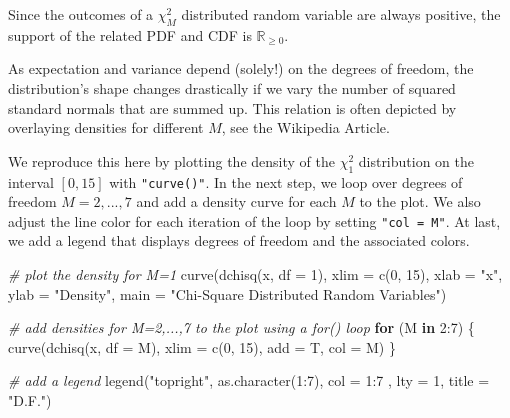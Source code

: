 \documentclass[
  14pt,
]{memoir}
\newenvironment{Shaded}{\begin{snugshade}}{\end{snugshade}}
\newcommand{\AttributeTok}[1]{\textcolor[rgb]{0.77,0.63,0.00}{#1}}
\newcommand{\CommentTok}[1]{\textcolor[rgb]{0.56,0.35,0.01}{\textit{#1}}}
\newcommand{\ControlFlowTok}[1]{\textcolor[rgb]{0.13,0.29,0.53}{\textbf{#1}}}
\newcommand{\DecValTok}[1]{\textcolor[rgb]{0.00,0.00,0.81}{#1}}
\newcommand{\FunctionTok}[1]{\textcolor[rgb]{0.00,0.00,0.00}{#1}}
\newcommand{\NormalTok}[1]{#1}
\newcommand{\SpecialCharTok}[1]{\textcolor[rgb]{0.00,0.00,0.00}{#1}}
\newcommand{\StringTok}[1]{\textcolor[rgb]{0.31,0.60,0.02}{#1}}
\begin{document}
Since the outcomes of a \(\chi^2_M\) distributed random variable are always positive, the support of the related PDF and CDF is \(\mathbb{R}_{\geq0}\).

As expectation and variance depend (solely!) on the degrees of freedom, the distribution's shape changes drastically if we vary the number of squared standard normals that are summed up. This relation is often depicted by overlaying densities for different \(M\), see the Wikipedia Article.

We reproduce this here by plotting the density of the \(\chi_1^2\) distribution on the interval \([0,15]\) with \texttt{"curve()"}. In the next step, we loop over degrees of freedom \(M=2,...,7\) and add a density curve for each \(M\) to the plot. We also adjust the line color for each iteration of the loop by setting \texttt{"col\ =\ M"}. At last, we add a legend that displays degrees of freedom and the associated colors.

\begin{Shaded}
\begin{Highlighting}[]
\CommentTok{\# plot the density for M=1}
\FunctionTok{curve}\NormalTok{(}\FunctionTok{dchisq}\NormalTok{(x, }\AttributeTok{df =} \DecValTok{1}\NormalTok{), }
      \AttributeTok{xlim =} \FunctionTok{c}\NormalTok{(}\DecValTok{0}\NormalTok{, }\DecValTok{15}\NormalTok{), }
      \AttributeTok{xlab =} \StringTok{"x"}\NormalTok{, }
      \AttributeTok{ylab =} \StringTok{"Density"}\NormalTok{, }
      \AttributeTok{main =} \StringTok{"Chi{-}Square Distributed Random Variables"}\NormalTok{)}

\CommentTok{\# add densities for M=2,...,7 to the plot using a \textquotesingle{}for()\textquotesingle{} loop }
\ControlFlowTok{for}\NormalTok{ (M }\ControlFlowTok{in} \DecValTok{2}\SpecialCharTok{:}\DecValTok{7}\NormalTok{) \{}
  \FunctionTok{curve}\NormalTok{(}\FunctionTok{dchisq}\NormalTok{(x, }\AttributeTok{df =}\NormalTok{ M),}
        \AttributeTok{xlim =} \FunctionTok{c}\NormalTok{(}\DecValTok{0}\NormalTok{, }\DecValTok{15}\NormalTok{), }
        \AttributeTok{add =}\NormalTok{ T, }
        \AttributeTok{col =}\NormalTok{ M)}
\NormalTok{\}}

\CommentTok{\# add a legend}
\FunctionTok{legend}\NormalTok{(}\StringTok{"topright"}\NormalTok{, }
       \FunctionTok{as.character}\NormalTok{(}\DecValTok{1}\SpecialCharTok{:}\DecValTok{7}\NormalTok{), }
       \AttributeTok{col =} \DecValTok{1}\SpecialCharTok{:}\DecValTok{7}\NormalTok{ , }
       \AttributeTok{lty =} \DecValTok{1}\NormalTok{, }
       \AttributeTok{title =} \StringTok{"D.F."}\NormalTok{)}
\end{Highlighting}
\end{Shaded}
\end{document}
